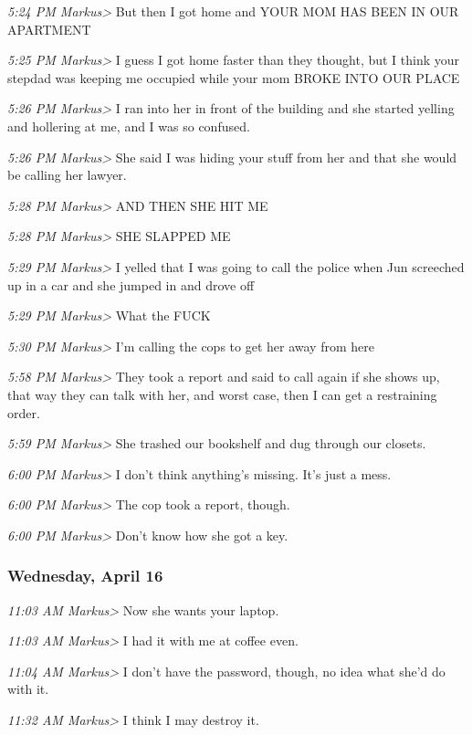 {\emph{5:24 PM Markus\textgreater{}} But then I got home and YOUR MOM HAS
BEEN IN OUR APARTMENT

\emph{5:25 PM Markus\textgreater{}} I guess I got home faster than they
thought, but I think your stepdad was keeping me occupied while your mom
BROKE INTO OUR PLACE

\emph{5:26 PM Markus\textgreater{}} I ran into her in front of the
building and she started yelling and hollering at me, and I was so
confused.

\emph{5:26 PM Markus\textgreater{}} She said I was hiding your stuff
from her and that she would be calling her lawyer.

\emph{5:28 PM Markus\textgreater{}} AND THEN SHE HIT ME

\emph{5:28 PM Markus\textgreater{}} SHE SLAPPED ME

\emph{5:29 PM Markus\textgreater{}} I yelled that I was going to call
the police when Jun screeched up in a car and she jumped in and drove
off

\emph{5:29 PM Markus\textgreater{}} What the FUCK

\emph{5:30 PM Markus\textgreater{}} I'm calling the cops to get her away
from here

\emph{5:58 PM Markus\textgreater{}} They took a report and said to call
again if she shows up, that way they can talk with her, and worst case,
then I can get a restraining order.

\emph{5:59 PM Markus\textgreater{}} She trashed our bookshelf and dug
through our closets.

\emph{6:00 PM Markus\textgreater{}} I don't think anything's missing.
It's just a mess.

\emph{6:00 PM Markus\textgreater{}} The cop took a report, though.

\emph{6:00 PM Markus\textgreater{}} Don't know how she got a key.

\subsubsection*{Wednesday, April 16}\label{wednesday-april-16}

\emph{11:03 AM Markus\textgreater{}} Now she wants your laptop.

\emph{11:03 AM Markus\textgreater{}} I had it with me at coffee even.

\emph{11:04 AM Markus\textgreater{}} I don't have the password, though,
no idea what she'd do with it.

\emph{11:32 AM Markus\textgreater{}} I think I may destroy it.

}
